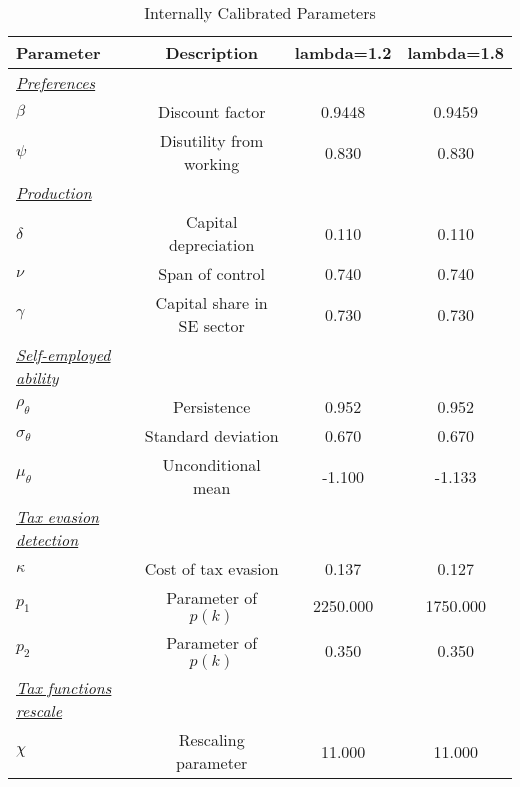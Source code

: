 \begin{table}[htbp] \centering 
\caption{Internally Calibrated Parameters} 
\label{table:parameters_inside} 
\begin{tabular}{lccc} \hline 
Parameter & Description & lambda=1.2  & lambda=1.8 \\ 
\hline \hline 
\textit{\underline{Preferences}} &  & &  \\  
$\beta$ & Discount factor &   0.9448 &   0.9459 \\ 
$\psi$ & Disutility from working &    0.830 &    0.830\\ 
\textit{\underline{Production}} &  & &  \\  
$\delta$ & Capital depreciation &    0.110 &    0.110\\ 
$\nu$ & Span of control &    0.740 &    0.740\\ 
$\gamma$ & Capital share in SE sector &    0.730 &    0.730\\ 
\textit{\underline{Self-employed ability}} &  & &  \\  
$\rho_{\theta}$   & Persistence        &    0.952 &    0.952\\ 
$\sigma_{\theta}$ & Standard deviation &    0.670 &    0.670 \\ 
$\mu_{\theta}     $ & Unconditional mean &   -1.100 &   -1.133 \\ [0.5ex] 
\textit{\underline{Tax evasion detection}} &  & &  \\  
$\kappa$ & Cost of tax evasion  &    0.137 &    0.127 \\ 
$p_{1}$ & Parameter of $p(k)$  & 2250.000 & 1750.000 \\ 
$p_{2}$ & Parameter of $p(k)$  &    0.350 &    0.350 \\ 
\textit{\underline{Tax functions rescale}} &  & &  \\  
$\chi$  & Rescaling parameter       &   11.000 &   11.000 \\ 
\hline \hline 
 \end{tabular} 
\end{table} 
